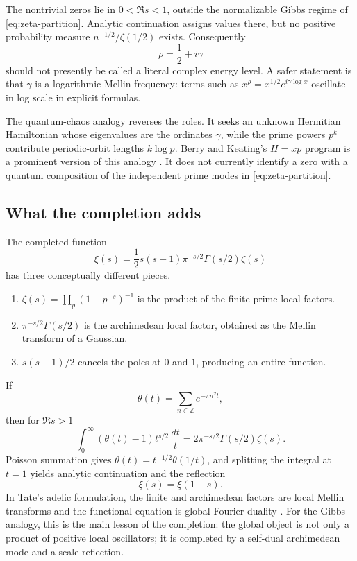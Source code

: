 \documentclass[11pt]{article}
\theoremstyle{definition}
\theoremstyle{plain}
\theoremstyle{remark}
\begin{document}
The nontrivial zeros lie in \(0<\Re s<1\), outside the normalizable Gibbs
regime of \eqref{eq:zeta-partition}.  Analytic continuation assigns values
there, but no positive probability measure \(n^{-1/2}/\zeta(1/2)\) exists.
Consequently
\[
  \rho=\frac12+i\gamma
\]
should not presently be called a literal complex energy level.  A safer
statement is that \(\gamma\) is a logarithmic Mellin frequency: terms such as
\(x^\rho=x^{1/2}e^{i\gamma\log x}\) oscillate in log scale in explicit
formulas.

The quantum-chaos analogy reverses the roles.  It seeks an unknown Hermitian
Hamiltonian whose eigenvalues are the ordinates \(\gamma\), while the prime
powers \(p^k\) contribute periodic-orbit lengths \(k\log p\).  Berry and
Keating's \(H=xp\) program is a prominent version of this analogy
\cite{berry-keating}.  It does not currently identify a zero with a quantum
composition of the independent prime modes in \eqref{eq:zeta-partition}.

\subsection{What the completion adds}

The completed function
\[
  \xi(s)=\frac12s(s-1)\pi^{-s/2}\Gamma(s/2)\zeta(s)
\]
has three conceptually different pieces.
\begin{enumerate}
  \item \(\zeta(s)=\prod_p(1-p^{-s})^{-1}\) is the product of the finite-prime
  local factors.
  \item \(\pi^{-s/2}\Gamma(s/2)\) is the archimedean local factor, obtained
  as the Mellin transform of a Gaussian.
  \item \(s(s-1)/2\) cancels the poles at \(0\) and \(1\), producing an
  entire function.
\end{enumerate}
If
\[
  \theta(t)=\sum_{n\in\mathbb Z}e^{-\pi n^2t},
\]
then for \(\Re s>1\)
\[
  \int_0^\infty(\theta(t)-1)t^{s/2}\,\frac{dt}{t}
  =2\pi^{-s/2}\Gamma(s/2)\zeta(s).
\]
Poisson summation gives \(\theta(t)=t^{-1/2}\theta(1/t)\), and splitting the
integral at \(t=1\) yields analytic continuation and the reflection
\[
  \xi(s)=\xi(1-s).
\]
In Tate's adelic formulation, the finite and archimedean factors are local
Mellin transforms and the functional equation is global Fourier duality
\cite{tate-thesis}.  For the Gibbs analogy, this is the main lesson of the
completion: the global object is not only a product of positive local
oscillators; it is completed by a self-dual archimedean mode and a scale
reflection.
\end{document}
